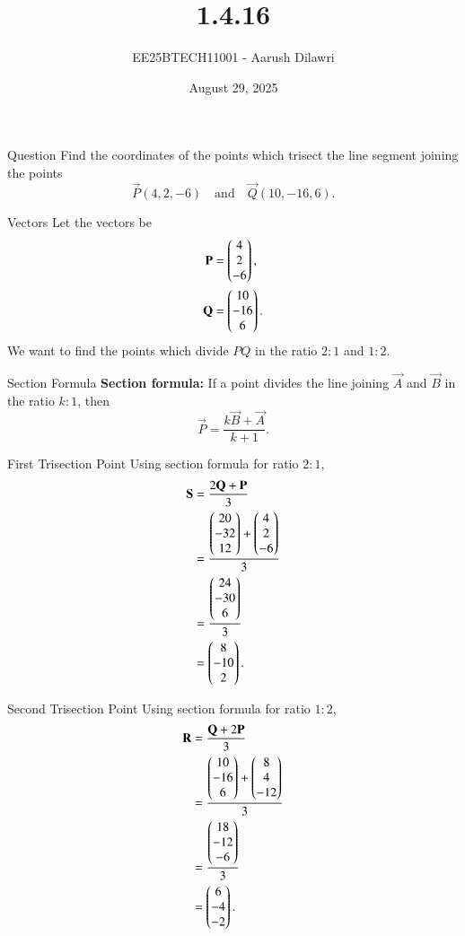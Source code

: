 \documentclass{beamer}
\title{1.4.16}
\date{August 29, 2025}
\author{EE25BTECH11001 - Aarush Dilawri}
\begin{document}
\frame{\titlepage}

\begin{frame}{Question}
Find the coordinates of the points which trisect the line segment joining the points 
\[
\vec{P}(4,2,-6) \quad \text{and} \quad \vec{Q}(10,-16,6).
\]
\end{frame}

\begin{frame}{Vectors}
Let the vectors be
\begin{align}
    \mathbf{P} &= \begin{pmatrix}4\\2\\-6\end{pmatrix}, \\
    \mathbf{Q} &= \begin{pmatrix}10\\-16\\6\end{pmatrix}.
\end{align}
We want to find the points which divide $PQ$ in the ratio $2:1$ and $1:2$.
\end{frame}

\begin{frame}{Section Formula}
\textbf{Section formula:}  
If a point divides the line joining $\vec{A}$ and $\vec{B}$ in the ratio $k:1$, then
\[
\vec{P} = \frac{k\vec{B} + \vec{A}}{k+1}.
\]
\end{frame}

\begin{frame}{First Trisection Point}
Using section formula for ratio $2:1$,
\begin{align}
    \mathbf{S} &= \frac{2\mathbf{Q} + \mathbf{P}}{3} \\
    &= \frac{\begin{pmatrix}20\\-32\\12\end{pmatrix} + \begin{pmatrix}4\\2\\-6\end{pmatrix}}{3} \\
    &= \frac{\begin{pmatrix}24\\-30\\6\end{pmatrix}}{3} \\
    &= \begin{pmatrix}8\\-10\\2\end{pmatrix}.
\end{align}
\end{frame}

\begin{frame}{Second Trisection Point}
Using section formula for ratio $1:2$,
\begin{align}
    \mathbf{R} &= \frac{\mathbf{Q} + 2\mathbf{P}}{3} \\
    &= \frac{\begin{pmatrix}10\\-16\\6\end{pmatrix} + \begin{pmatrix}8\\4\\-12\end{pmatrix}}{3} \\
    &= \frac{\begin{pmatrix}18\\-12\\-6\end{pmatrix}}{3} \\
    &= \begin{pmatrix}6\\-4\\-2\end{pmatrix}.
\end{align}
\end{frame}
\end{document}
